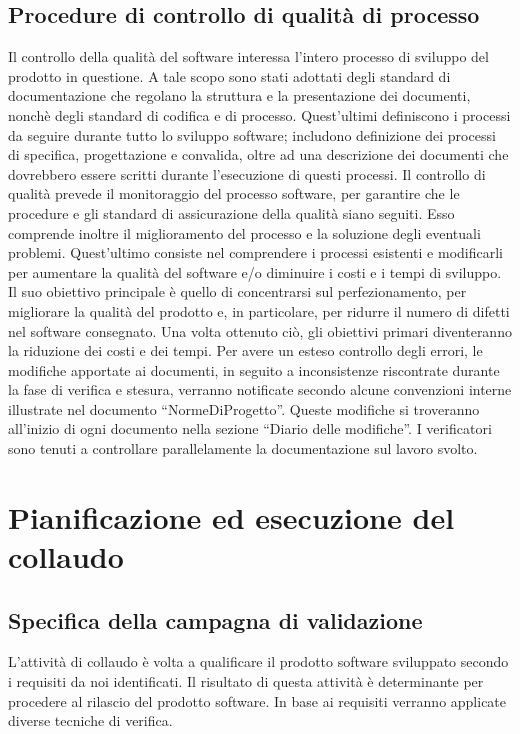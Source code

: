 \documentclass[11pt,titlepage,a4paper]{report}
\begin{document}
\section{Procedure di controllo di qualit\`a di processo}
Il controllo della qualit\`a del software interessa l'intero processo di sviluppo del prodotto in questione. A tale scopo sono stati adottati degli standard di documentazione che regolano la struttura e la presentazione dei documenti, nonch\`e degli standard di codifica e di processo. Quest'ultimi definiscono i processi da seguire durante tutto lo sviluppo software; includono definizione dei processi di specifica, progettazione e convalida, oltre ad una descrizione dei documenti che dovrebbero essere scritti durante l'esecuzione di questi processi. Il controllo di qualit\`a prevede il monitoraggio del processo software, per garantire che le procedure e gli standard di assicurazione della qualit\`a siano seguiti. Esso comprende inoltre il miglioramento del processo e la soluzione degli eventuali problemi. Quest'ultimo consiste nel comprendere i processi esistenti e modificarli per aumentare la qualit\`a del software e/o diminuire i costi e i tempi di sviluppo. Il suo obiettivo principale \`e quello di concentrarsi sul perfezionamento, per migliorare la qualit\`a del prodotto e, in particolare, per ridurre il numero di difetti nel software consegnato. Una volta ottenuto ci\`o, gli obiettivi primari diventeranno la riduzione dei costi e dei tempi.
Per avere un esteso controllo degli errori, le modifiche apportate ai documenti, in seguito a inconsistenze riscontrate durante la fase di verifica e stesura, verranno notificate secondo alcune convenzioni interne illustrate nel documento ``NormeDiProgetto''. Queste modifiche si troveranno all'inizio di ogni documento nella sezione ``Diario delle modifiche''. I verificatori sono tenuti a controllare parallelamente la documentazione sul lavoro svolto.

\chapter[Collaudo]{Pianificazione ed esecuzione del collaudo}
\section[Campagna di validazione]{Specifica della campagna di validazione}
L'attivit\`a di collaudo \`e volta a qualificare il prodotto software sviluppato secondo i requisiti da noi identificati. Il risultato di questa attivit\`a \`e determinante per procedere al rilascio del prodotto software. In base ai requisiti verranno applicate diverse tecniche di verifica.
\end{document}

